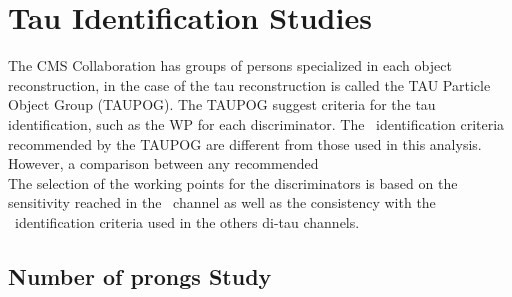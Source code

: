 \chapter{Tau Identification Studies}
\label{chap:TauIDStudies}

The CMS Collaboration has groups of persons specialized in each 
object reconstruction, in the case of the tau reconstruction is called 
the TAU Particle Object Group (TAUPOG). The TAUPOG suggest criteria
for the tau identification, such as the WP for each discriminator. The 
\tauh~identification criteria recommended by the TAUPOG are different 
from those used in this analysis. However, a comparison between any 
recommended \\
 The selection of the working points for the discriminators is 
 based on the sensitivity reached in the \Zprimetotauh~channel
 as well as the consistency with the \tauh~identification criteria
 used in the others di-tau channels. 



\section{Number of prongs Study}
\label{Results:TauID-nprongs}

